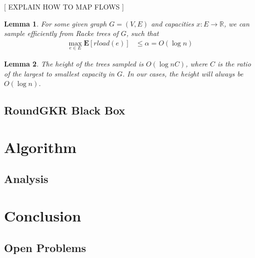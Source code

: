 \documentclass[12pt]{article}
\newtheorem{lemma}{Lemma}
\begin{document}
[ EXPLAIN HOW TO MAP FLOWS ]

\begin{lemma}
For some given graph $G = (V, E)$ and capacities $x: E \rightarrow \mathbb{R}$, we can sample efficiently from Racke trees of $G$, such that 
\begin{align}
\max_{e \in E} \textbf{E}[rload(e)] &\leq \alpha = O(\log n) 
\end{align}
\end{lemma}

\begin{lemma}
The height of the trees sampled is $O(\log nC)$, where $C$ is the ratio of the largest to smallest capacity in $G$. In our cases, the height will always be $O(\log n)$. 
\end{lemma}

\subsection{RoundGKR Black Box}

\section{Algorithm}

\subsection{Analysis}

\section{Conclusion}

\subsection{Open Problems}
\end{document}

